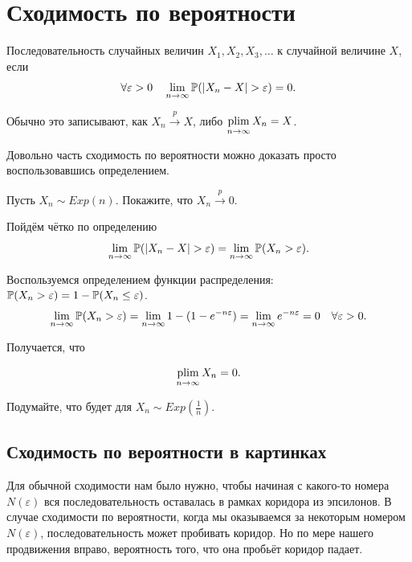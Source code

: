 \documentclass[12pt, a4paper, oneside]{article}
\begin{document}
\section{Сходимость по вероятности}

\begin{definition} 
Последовательность случайных величин $X_1, X_2, X_3, \ldots$  к случайной величине $X$, если 
\[
\forall \varepsilon > 0 \quad \lim_{n \to \infty} \mathbb{P}(|X_n - X| > \varepsilon) = 0.
\]

Обычно это записывают, как $X_n \overset{p}{\to} X$, либо $\operatorname*{plim}\limits_{n \to \infty} X_n = X$.
\end{definition} 

Довольно часть сходимость по вероятности можно доказать просто воспользовавшись определением.  

\begin{problem}{ } 
Пусть $X_n \sim Exp(n)$. Покажите, что $X_n \overset{p}{\to} 0$.
\end{problem} 

\begin{sol}
Пойдём чётко по определению
\[
\lim_{n \to \infty} \mathbb{P}(|X_n - X| > \varepsilon) = \lim_{n \to \infty} \mathbb{P}(X_n > \varepsilon).
\]

Воспользуемся определением функции распределения: $\mathbb{P}(X_n > \varepsilon) = 1 - \mathbb{P}(X_n \le \varepsilon)$.
\[
\lim_{n \to \infty} \mathbb{P}(X_n > \varepsilon) = \lim_{n \to \infty} 1 - (1 - e^{-n \varepsilon}) = \lim_{n \to \infty}  e^{-n \varepsilon} = 0 \quad \forall \varepsilon > 0.
\]

Получается, что 

\[
\operatorname*{plim}_{n \to \infty} X_n = 0.
\]

Подумайте, что будет для $X_n \sim Exp\left( \frac{1}{n} \right)$.
\end{sol}

\subsection{Сходимость по вероятности в картинках}

Для обычной сходимости нам было нужно, чтобы начиная с какого-то номера $N(\varepsilon)$ вся последовательность оставалась в рамках коридора из эпсилонов. В случае сходимости по вероятности, когда мы оказываемся за некоторым номером $N(\varepsilon)$, последовательность может пробивать коридор. Но по мере нашего продвижения вправо, вероятность того, что она пробьёт коридор падает. 
\end{document}
